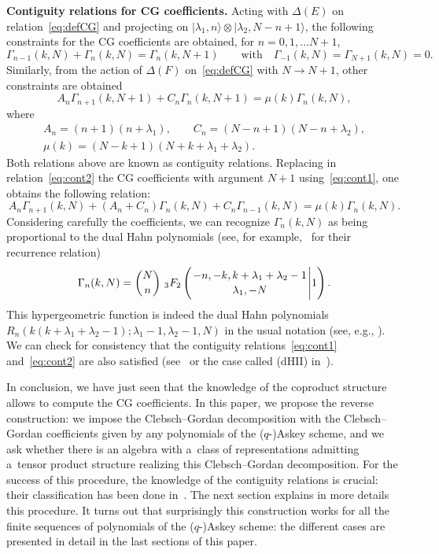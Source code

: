 \documentclass[pdftex]{sigma}
\numberwithin{equation}{section}
\theoremstyle{definition}
\begin{document}
{\bf Contiguity relations for CG coefficients.}
Acting with $\Delta(E)$ on relation~\eqref{eq:defCG} and projecting on $|\lambda_1,n\rangle\otimes |\lambda_2,N-n+1\rangle$, the following constraints for the CG coefficients are obtained, for $n=0,1,\dots N+1$,
\begin{equation}\label{eq:cont1}
 \Gamma_{n-1}(k,N)+\Gamma_n(k,N)=\Gamma_n(k,N+1) \qquad \text{with} \quad\Gamma_{-1}(k,N)=\Gamma_{N+1}(k,N)=0.
\end{equation}
Similarly, from the action of $\Delta(F)$ on~\eqref{eq:defCG} with $N\to N+1$, other constraints are obtained
\begin{equation}\label{eq:cont2}
 A_n \Gamma_{n+1}(k,N+1)+C_n \Gamma_n(k,N+1)=\mu(k)\Gamma_n(k,N),
\end{equation}
where
\begin{gather*}
A_n= (n+1)(n+\lambda_1),\qquad C_n=(N-n+1)(N-n+\lambda_2),\\ \mu(k)=(N-k+1)(N+k+\lambda_1+\lambda_2).
\end{gather*}
Both relations above are known as contiguity relations. Replacing in relation~\eqref{eq:cont2} the CG coefficients with argument $N+1$ using~\eqref{eq:cont1}, one obtains the following relation:
\[ A_n \Gamma_{n+1}(k,N)+(A_n+C_n)\Gamma_{n}(k,N)+C_n \Gamma_{n-1}(k,N)=\mu(k)\Gamma_n(k,N).\]
Considering carefully the coefficients, we can recognize $\Gamma_n(k,N)$ as being proportional to the dual Hahn polynomials (see, for example,~\cite{KLS10} for their recurrence relation)
\[
 \Gamma_n(k,N)=\binom{N}{n}\ {}_3F_2 \left({{-n, -k, k+\lambda_1+\lambda_2-1}\atop
{\lambda_1, -N}} \Bigg\vert  1\right).
\]
This hypergeometric function is indeed the dual Hahn polynomials $R_n(k(k+\lambda_1+\lambda_2-1);\allowbreak{\lambda_1-1},\lambda_2-1,N)$ in the usual notation (see, e.g., \cite{KLS10}).
We can check for consistency that the contiguity relations~\eqref{eq:cont1} and~\eqref{eq:cont2} are also satisfied (see~\cite{OV16} or the case called (dHII) in~\cite{contiguity}).

In conclusion, we have just seen that
the knowledge of the coproduct structure allows to compute the CG coefficients.
In this paper, we propose the reverse construction: we impose the Clebsch--Gordan decomposition with the Clebsch--Gordan coefficients given by any polynomials of the ($q$-)Askey scheme, and we ask whether there is an algebra with a~class of representations admitting a~tensor product structure realizing this Clebsch--Gordan decomposition. For the success of this procedure, the knowledge of the contiguity relations is crucial: their classification has been done in~\cite{contiguity}.
The next section explains in more details this procedure.
It turns out that surprisingly this construction works for all the finite sequences of polynomials of the ($q$-)Askey scheme: the different cases are presented in detail in the last sections of this paper.
\end{document}
